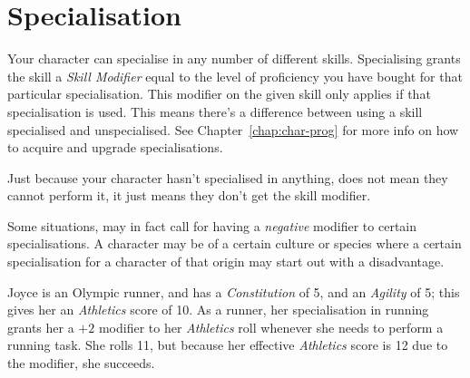 \section{Specialisation}\label{sec:specialisation}
Your character can specialise in any number of different skills.
Specialising grants the skill a \textit{Skill Modifier} equal to the level of proficiency you have bought for that particular specialisation.
This modifier on the given skill only applies if that specialisation is used.
This means there's a difference between using a skill specialised and unspecialised.
See Chapter~\ref{chap:char-prog} for more info on how to acquire and upgrade specialisations.

\begin{note} 
    Just because your character hasn't specialised in anything, does not mean they cannot perform it, it just means they don't get the skill modifier.

    Some situations, may in fact call for having a \textit{negative} modifier to certain specialisations.
    A character may be of a certain culture or species where a certain specialisation for a character of that origin may start out with a disadvantage.
\end{note}

\begin{example}
    Joyce is an Olympic runner, and has a \textit{Constitution} of 5, and an \textit{Agility} of 5; this gives her an \textit{Athletics} score of 10. 
    As a runner, her specialisation in running grants her a $+2$ modifier to her \textit{Athletics} roll whenever she needs to perform a running task.
    She rolls 11, but because her effective \textit{Athletics} score is 12 due to the modifier, she succeeds.
\end{example}